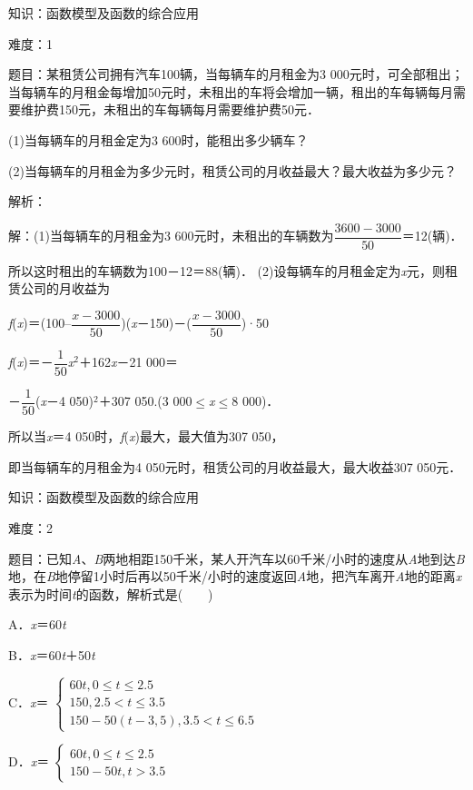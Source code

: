 \documentclass{article} %
\begin{document}
知识：函数模型及函数的综合应用

难度：1

题目：某租赁公司拥有汽车100辆，当每辆车的月租金为3 000元时，可全部租出；当每辆车的月租金每增加50元时，未租出的车将会增加一辆，租出的车每辆每月需要维护费150元，未租出的车每辆每月需要维护费50元．

(1)当每辆车的月租金定为3 600时，能租出多少辆车？

(2)当每辆车的月租金为多少元时，租赁公司的月收益最大？最大收益为多少元？

解析：

解：(1)当每辆车的月租金为3 600元时，未租出的车辆数为$\dfrac{3600-3000}{50}$＝12(辆)．

所以这时租出的车辆数为100－12＝88(辆)．
(2)设每辆车的月租金定为\textit{x}元，则租赁公司的月收益为

\textit{f}(\textit{x})＝(100--$\dfrac{x-3000}{50}$)(\textit{x}－150)－($\dfrac{x-3000}{50}$)·50

\textit{f}(\textit{x})＝－$\dfrac{1}{50}$\textit{x}${}^{2}$＋162\textit{x}－21 000＝

－$\dfrac{1}{50}$(\textit{x}－4 050)${}^{2}$＋307 050.(3 000$\mathrm{\le}$\textit{x}$\mathrm{\le}$8 000)．

所以当\textit{x}＝4 050时，\textit{f}(\textit{x})最大，最大值为307 050，

即当每辆车的月租金为4 050元时，租赁公司的月收益最大，最大收益307 050元．

知识：函数模型及函数的综合应用

难度：2

题目：已知\textit{A}、\textit{B}两地相距150千米，某人开汽车以60千米/小时的速度从\textit{A}地到达\textit{B}地，在\textit{B}地停留1小时后再以50千米/小时的速度返回\textit{A}地，把汽车离开\textit{A}地的距离\textit{x}表示为时间\textit{t}的函数，解析式是(　　)

A．\textit{x}＝60\textit{t}

B．\textit{x}＝60\textit{t}＋50\textit{t}

C．\textit{x}＝
$\left\{
\begin{array}{l}
60t, 0\le t\le2.5\\
150, 2.5< t\le3.5\\
150-50(t-3,5), 3.5< t\le6.5
\end{array}
\right.$

D．\textit{x}＝
$\left\{
\begin{array}{l}
60t, 0\le t\le2.5\\
150-50t, t> 3.5
\end{array}
\right.$
\end{document}
